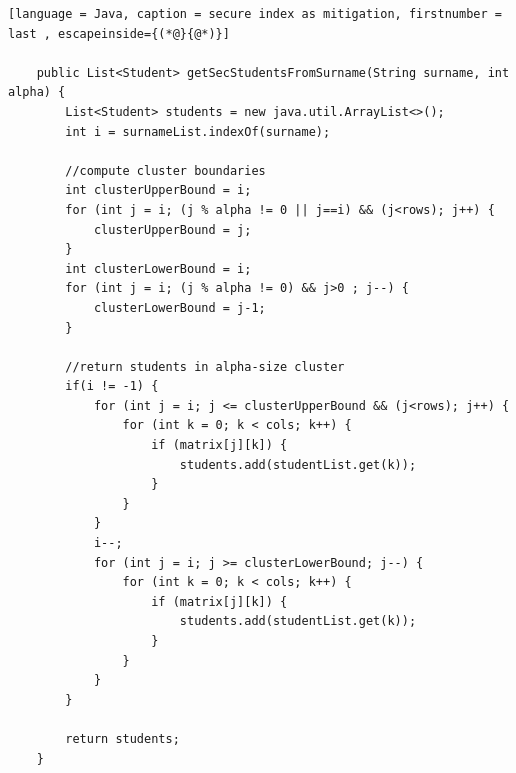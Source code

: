 \begin{lstlisting}[language = Java, caption = secure index as mitigation, firstnumber = last , escapeinside={(*@}{@*)}]

    public List<Student> getSecStudentsFromSurname(String surname, int alpha) {
        List<Student> students = new java.util.ArrayList<>();
        int i = surnameList.indexOf(surname);

        //compute cluster boundaries
        int clusterUpperBound = i;
        for (int j = i; (j % alpha != 0 || j==i) && (j<rows); j++) {
            clusterUpperBound = j;
        }
        int clusterLowerBound = i;
        for (int j = i; (j % alpha != 0) && j>0 ; j--) {
            clusterLowerBound = j-1;
        }

        //return students in alpha-size cluster
        if(i != -1) {
            for (int j = i; j <= clusterUpperBound && (j<rows); j++) {
                for (int k = 0; k < cols; k++) {
                    if (matrix[j][k]) {
                        students.add(studentList.get(k));
                    }
                }
            }
            i--;
            for (int j = i; j >= clusterLowerBound; j--) {
                for (int k = 0; k < cols; k++) {
                    if (matrix[j][k]) {
                        students.add(studentList.get(k));
                    }
                }
            }
        }

        return students;
    }
\end{lstlisting}